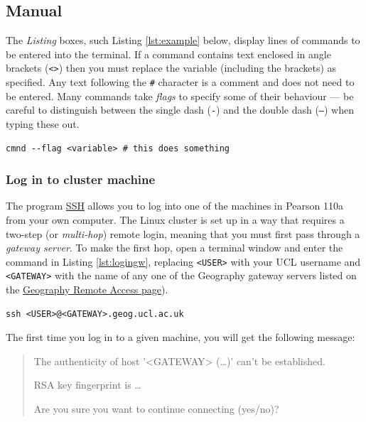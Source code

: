 \documentclass[a4paper]{article}
\newenvironment{ttt}{\ttfamily}{\par} %
\begin{document}
\subsection{Manual}
\label{sec:manual}

The \emph{Listing} boxes, such Listing \ref{lst:example} below, display lines of commands to be entered into the terminal.
If a command contains text enclosed in angle brackets (\texttt{\textless{}\textgreater{}}) then you must replace the variable (including the brackets) as specified.
Any text following the \texttt{\#} character is a comment and does not need to be entered.
Many commands take \emph{flags} to specify some of their behaviour --- be careful to distinguish between the single dash (\texttt{-}) and the double dash (\texttt{--}) when typing these out.
\begin{lstlisting}[caption={An example of a command}, label={lst:example}]
cmnd --flag <variable> # this does something
\end{lstlisting}

\subsubsection{Log in to cluster machine}
\label{sec:login}
The program \href{http://linuxcommand.org/man_pages/ssh1.html}{SSH} allows you to log into one of the machines in Pearson 110a from your own computer.
The Linux cluster is set up in a way that requires a two-step (or \emph{multi-hop}) remote login, meaning that you must first pass through a \emph{gateway server}. 
To make the first hop, open a terminal window and enter the command in Listing \ref{lst:logingw}, replacing \texttt{\textless{}USER\textgreater{}} with your UCL username and \texttt{\textless{}GATEWAY\textgreater{}} with the name of any one of the Geography gateway servers listed on the \href{http://www.geog.ucl.ac.uk/resources/computer-support/linux-remote-access}{Geography Remote Access page}).

\begin{lstlisting}[caption={Login to gateway}, label={lst:logingw}]
ssh <USER>@<GATEWAY>.geog.ucl.ac.uk
\end{lstlisting}

The first time you log in to a given machine, you will get the following message:

\begin{quote}
\begin{ttt}
The authenticity of host '\textless{}GATEWAY\textgreater{} (\ldots)' can't be established.

RSA key fingerprint is \ldots{}

Are you sure you want to continue connecting (yes/no)?
\end{ttt}
\end{quote}
\end{document}
